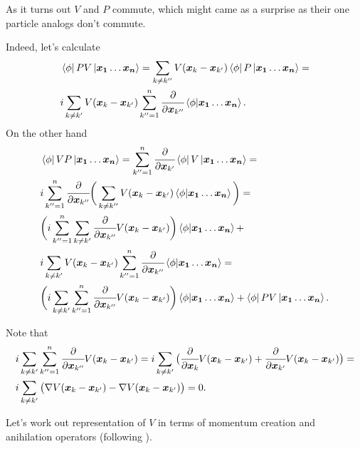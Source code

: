 \documentclass[main.tex]{subfiles}
\begin{document}
As it turns out $V$ and $P$ commute, which might came as a surprise as their one particle analogs don't commute.

Indeed, let's calculate 
\begin{align*}
& \bra{\phi}PV\ket{\bs{x_1}\dots\bs{x_n}} = \sum_{k\not=k''} V(\bs{x}_k - \bs{x}_{k'}) \bra{\phi}P\ket{\bs{x_1}\dots\bs{x_n}} = \\
& i\sum_{k\not=k'} V(\bs{x}_k - \bs{x}_{k'}) \sum_{k''=1}^n \cfrac{\partial}{\partial \bs{x}_{k''}}\bra{\phi}\ket{\bs{x_1}\dots\bs{x_n}}.
\end{align*}
On the other hand
\begin{align*}
& \bra{\phi}VP\ket{\bs{x_1}\dots\bs{x_n}} = \sum_{k''=1}^n \cfrac{\partial}{\partial \bs{x}_{k'}}\bra{\phi}V\ket{\bs{x_1}\dots\bs{x_n}} = \\
& i\sum_{k''=1}^n \cfrac{\partial}{\partial \bs{x}_{k''}} \bigg(  \sum_{k\not=k''} V(\bs{x}_k - \bs{x}_{k'}) \bra{\phi}\ket{\bs{x_1}\dots\bs{x_n}} \bigg) = \\
& \bigg( i\sum_{k''=1}^n  \sum_{k\not=k'} \cfrac{\partial}{\partial \bs{x}_{k''}}  V(\bs{x}_k - \bs{x}_{k'}) \bigg) \bra{\phi}\ket{\bs{x_1}\dots\bs{x_n}}  + \\ 
& i\sum_{k\not=k'} V(\bs{x}_k - \bs{x}_{k'}) \sum_{k''=1}^n \cfrac{\partial}{\partial \bs{x}_{k''}}\bra{\phi}\ket{\bs{x_1}\dots\bs{x_n}} = \\
& \bigg( i \sum_{k\not=k'} \sum_{k''=1}^n  \cfrac{\partial}{\partial \bs{x}_{k''}}  V(\bs{x}_k - \bs{x}_{k'}) \bigg) \bra{\phi}\ket{\bs{x_1}\dots\bs{x_n}} + 
\bra{\phi}PV\ket{\bs{x_1}\dots\bs{x_n}}.
\end{align*}

Note that 
\begin{align*}
& i \sum_{k\not=k'} \sum_{k''=1}^n  \cfrac{\partial}{\partial \boldsymbol{x}_{k''}}  V(\boldsymbol{x}_k - \boldsymbol{x}_{k'}) = i \sum_{k\not=k'} \big(\cfrac{\partial}{\partial \boldsymbol{x}_{k}}  V(\boldsymbol{x}_k - \boldsymbol{x}_{k'}) + \cfrac{\partial}{\partial \boldsymbol{x}_{k'}}  V(\boldsymbol{x}_k - \boldsymbol{x}_{k'})\big) = \\
& i \sum_{k\not=k'} \big(\nabla V(\boldsymbol{x}_k - \boldsymbol{x}_{k'}) - \nabla V (\boldsymbol{x}_k - \boldsymbol{x}_{k'}) \big) = 0.
\end{align*}

Let's work out representation of $V$ in terms of momentum creation and anihilation operators (following \cite{lancaster-blundell2018}).
\end{document}
